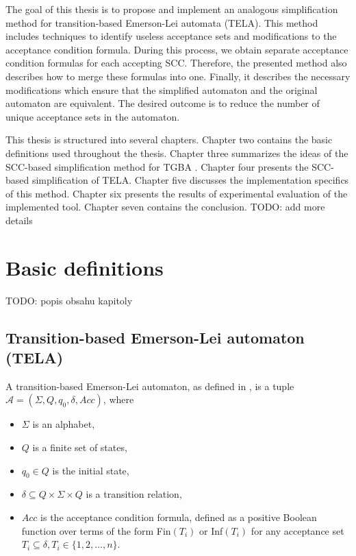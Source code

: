 \documentclass[
  digital, %
  twoside, %
  table,   %
  lof,     %
  lot,     %
]{fithesis3}
\begin{document}
The goal of this thesis is to propose and implement an analogous simplification method for transition-based Emerson-Lei automata (TELA). This method includes techniques to identify useless acceptance sets and modifications to the acceptance condition formula. During this process, we obtain separate acceptance condition formulas for each accepting SCC. Therefore, the presented method also describes how to merge these formulas into one. Finally, it describes the necessary modifications which ensure that the simplified automaton and the original automaton are equivalent. The desired outcome is to reduce the number of unique acceptance sets in the automaton. 

This thesis is structured into several chapters. Chapter two contains the basic definitions used throughout the thesis. Chapter three summarizes the ideas of the SCC-based simplification method for TGBA \cite{spin2013}. Chapter four presents the SCC-based simplification of TELA. Chapter five discusses the implementation specifics of this method. Chapter six presents the results of experimental evaluation of the implemented tool. Chapter seven contains the conclusion. TODO: add more details

\chapter{Basic definitions}
\label{chap:basic_definitions}
TODO: popis obsahu kapitoly

\section{Transition-based Emerson-Lei automaton (TELA)} 
\label{sec:tela}
A transition-based Emerson-Lei automaton, as defined in \cite{bloemen2017}, is a tuple $\mathcal{A} = (\Sigma, Q, q_0, \delta, Acc)$, where
\begin{itemize}
  \item $\Sigma$ is an alphabet,
  \item $Q$ is a finite set of states,
  \item $q_0 \in Q$ is the initial state,
  \item $\delta \subseteq Q \times \Sigma \times Q$ is a transition relation,
  \item $Acc$ is the acceptance condition formula, defined as a positive Boolean function over terms of the form Fin$(T_i)$ or Inf$(T_i)$ for any acceptance set $T_i \subseteq \delta, T_i \in \{1, 2, \dots, n\}$. 
\end{itemize}
\end{document}
